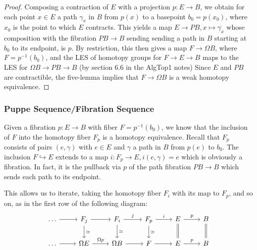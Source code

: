 \documentclass[reqno]{amsart}
\theoremstyle{definition}
\theoremstyle{remark}
\begin{document}
     \begin{proof}
         Composing a contraction of $E$ with a projection
         $p \colon E \to B$, we obtain for each
         point $x \in E$ a path
         $\gamma_x$ in $B$ from $p(x)$ to a basepoint
         $b_0 = p(x_0)$, where $x_0$ is the point to which
         $E$ contracts.
         This yields a map $E \to PB, x\mapsto \overline{\gamma_x}$ 
         whose composition with the fibration
         $PB \to B$ sending
         sending a path in $B$ starting at $b_0$ to
         its endpoint, is $p$.
         By restriction, this then gives
         a map $F \to \Omega B$, where
         $F = p^{-1}(b_0)$, and the LES of
         homotopy groups for $F \to E \to B$ maps
         to the LES for 
         $\Omega B \to PB \to B$ (by section 6.6 in the 
         AlgTop1 notes)
         Since $E$ and $PB$ are contractible, the five-lemma
         implies that $F \to \Omega B$ is a weak homotopy
         equivalence.
     \end{proof}

     \subsubsection{Puppe Sequence/Fibration Sequence}

     Given a fibration $p \colon E \to B$ with
     fiber $F = p^{-1}(b_0)$, we know that the
     inclusion of $F$ into the homotopy fiber
     $F_p$ is a homotopy equivalence. Recall
     that $F_p $ consists of pairs
     $(e, \gamma)$ with $e \in E$ and
     $\gamma$ a path in $B$ from $p(e)$ to $b_0$.
     The inclusion $F \hookrightarrow E$ extends
     to a map $i \colon F_p \to E,
     i(e, \gamma) = e$ which is obviously a fibration.
     In fact, it is the pullback via $p$ of the path
     fibration $PB \to B$ which sends each
     path to its endpoint.

     This allows us to iterate, taking
     the homotopy fiber $F_i$ with its map to
     $F_p$, and so on, as in the first row of the
     following diagram:
     \begin{equation*}
     \begin{tikzcd}
         \ldots \ar[r] & F_j \ar[r] \ar[d, "\simeq"] &
         F_i \ar[r, "j"] \ar[d, "\simeq"] &
         F_p \ar[r, "i"] \ar[d, "\simeq"] & E \ar[r, "p"] 
         \ar[d, equal] &
B \ar[d, equal] \\
             \ldots \ar[r] & \Omega E \ar[r, "\Omega p"] &
         \Omega B \ar[r] & F \ar[r] & E \ar[r, "p"] & B
     \end{tikzcd}
     \end{equation*}















\end{document}
